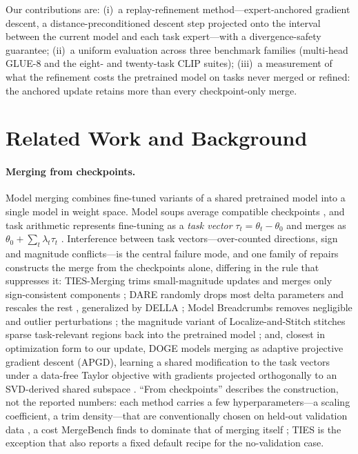 \documentclass{article} %
\newcommand{\thetab}{\theta_0}
\newcommand{\taskvec}{\tau}
\begin{document}
Our contributions are:
(i)~a replay-refinement method---expert-anchored gradient descent, a distance-preconditioned descent step projected onto the interval between the current model and each task expert---with a divergence-safety guarantee;
(ii)~a uniform evaluation across three benchmark families (multi-head GLUE-8 and the eight- and twenty-task CLIP suites);
(iii)~a measurement of what the refinement costs the pretrained model on tasks never merged or refined: the anchored update retains more than every checkpoint-only merge.

\section{Related Work and Background}
\label{sec:related}

\paragraph{Merging from checkpoints.}
Model merging combines fine-tuned variants of a shared pretrained model into a single model in weight space. Model soups average compatible checkpoints \citep{wortsman2022modelsoups}, and task arithmetic represents fine-tuning as a \emph{task vector} $\taskvec_t=\theta_t-\thetab$ and merges as $\thetab+\sum_t\lambda_t\taskvec_t$ \citep{ilharco2022taskarithmetic}. Interference between task vectors---over-counted directions, sign and magnitude conflicts---is the central failure mode, and one family of repairs constructs the merge from the checkpoints alone, differing in the rule that suppresses it: TIES-Merging trims small-magnitude updates and merges only sign-consistent components \citep{yadav2023ties}; DARE randomly drops most delta parameters and rescales the rest \citep{yu2023dare}, generalized by DELLA \citep{deep2024della}; Model Breadcrumbs removes negligible and outlier perturbations \citep{davari2023breadcrumbs}; the magnitude variant of Localize-and-Stitch stitches sparse task-relevant regions back into the pretrained model \citep{he2024localize}; and, closest in optimization form to our update, DOGE models merging as adaptive projective gradient descent (APGD), learning a shared modification to the task vectors under a data-free Taylor objective with gradients projected orthogonally to an SVD-derived shared subspace \citep{wei2025apgd}. ``From checkpoints'' describes the construction, not the reported numbers: each method carries a few hyperparameters---a scaling coefficient, a trim density---that are conventionally chosen on held-out validation data \citep{ilharco2022taskarithmetic,yadav2023ties}, a cost MergeBench finds to dominate that of merging itself \citep{he2025mergebench}; TIES is the exception that also reports a fixed default recipe for the no-validation case.
\end{document}

